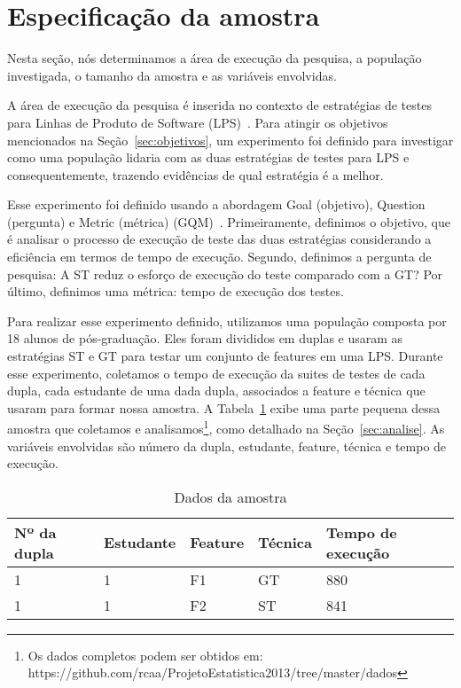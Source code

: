 \section{Especifica\c{c}\~ao da amostra}
\label{sec:especificacao}


Nesta seção, nós determinamos a área de execução da pesquisa, a população investigada, o tamanho da amostra e as variáveis envolvidas.

A área de execução da pesquisa é inserida no contexto de estratégias de testes para Linhas de Produto de Software (LPS)~\cite{pohl-book}. Para atingir os objetivos mencionados na Seção~\ref{sec:objetivos}, um experimento foi definido para investigar como uma população lidaria com as duas estratégias de testes para LPS e consequentemente, trazendo evidências de qual estratégia é a melhor.

Esse experimento foi definido usando a abordagem Goal (objetivo), Question (pergunta) e Metric (métrica) (GQM)~\cite{gqm}. Primeiramente, definimos o objetivo, que é analisar o processo de execução de teste das duas estratégias considerando a eficiência em termos de tempo de execução. Segundo, definimos a pergunta de pesquisa: A ST reduz o esforço de execução do teste comparado com a GT? Por último, definimos uma métrica: tempo de execução dos testes.

Para realizar esse experimento definido, utilizamos uma população composta por 18 alunos de pós-graduação. Eles foram divididos em duplas e usaram as estratégias ST e GT para testar um conjunto de features em uma LPS. Durante esse experimento, coletamos o tempo de execução da suites de testes de cada dupla, cada estudante de uma dada dupla, associados a feature e técnica que usaram para formar nossa amostra. A Tabela~\ref{tab:amostra} exibe uma parte pequena dessa amostra que coletamos e analisamos\footnote{Os dados completos podem ser obtidos em: https://github.com/rcaa/ProjetoEstatistica2013/tree/master/dados}, como detalhado na Seção~\ref{sec:analise}. As variáveis envolvidas são número da dupla, estudante, feature, técnica e tempo de execução.

\begin{table}[h]\footnotesize
    \caption{Dados da amostra}
    \centering
    \begin{tabular}{|l|l|l|l|l|}
    \addlinespace
    \hline
    {\bf Nº da dupla}  & {\bf Estudante} & {\bf Feature} & {\bf Técnica} & {\bf Tempo de execução}\\ \hline
    1 & 1 & F1 & GT & 880\\ \hline
    1 & 1 & F2 & ST & 841\\ \hline
    \end{tabular}
  \label{tab:amostra}
\end{table}

